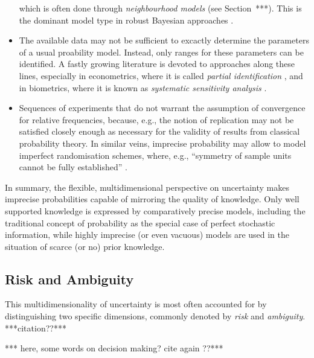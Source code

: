\begin{itemize}
which is often done through \emph{neighbourhood models} (see Section~***).
This is the dominant model type in robust Bayesian approaches \parencite[see, e.g.,][]{1994:berger}.
\item The available data may not be sufficient to excactly determine the parameters of a usual proability model.
Instead, only ranges for these parameters can be identified.
A fastly growing literature is devoted to approaches along these lines,
especially in econometrics, where it is called \emph{partial identification} \parencite[e.g.,][]{2003:manski},
and in biometrics, where it is known as \emph{systematic sensitivity analysis} \parencite[e.g.,][]{vansteelandt2006}.
\item Sequences of experiments that do not warrant the assumption of convergence
for relative frequencies, because, e.g., the notion of replication may not be
satisfied closely enough as necessary for the validity of results from classical probability theory.
In similar veins, imprecise probability may allow to model
imperfect randomisation schemes, where, e.g., ``symmetry of sample units cannot be fully established''
\parencite[\S 2.5]{itip-statinf}.
\end{itemize}
In summary,
the flexible, multidimensional perspective on uncertainty makes imprecise probabilities capable of mirroring the quality of knowledge.
Only well supported knowledge is expressed by comparatively precise models,
including the traditional concept of probability as the special case of perfect stochastic information,
while highly imprecise (or even vacuous) models are used in the situation of scarce (or no) prior knowledge.

\subsection{Risk and Ambiguity}
\label{sec:motivation-riskambiguity}

This multidimensionality of uncertainty is most often accounted for
by distinguishing two specific dimensions,
commonly denoted by \emph{risk} and \emph{ambiguity}. ***citation??***

***\parencite{1961:ellsberg} here, some words on decision making? cite again \parencite{2005:hsu-bhatt}??***

